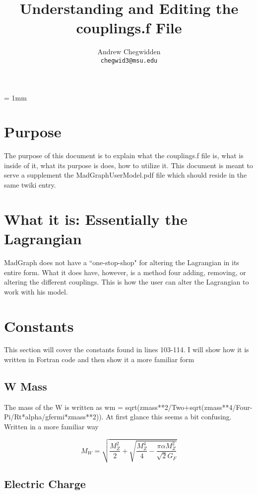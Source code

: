 \documentclass{article}
\author{Andrew Chegwidden\\
\texttt{chegwid3@msu.edu}
}
\title{Understanding and Editing the couplings.f File}
\begin{document}
\unitlength = 1mm

\maketitle

\section{Purpose}

The purpose of this document is to explain what the couplings.f file is, what is inside of it, what its purpose is does, how to utilize it.  This document is meant to serve a supplement the MadGraphUserModel.pdf file which should reside in the same twiki entry.

\section{What it is: Essentially the Lagrangian}

MadGraph does not have a ``one-stop-shop" for altering the Lagrangian in its entire form.  What it does have, however, is a method four adding, removing, or altering the different couplings.  This is how the user can alter the Lagrangian to work with his model.  

\section{Constants}

This section will cover the constants found in lines 103-114.  I will show how it is written in Fortran code and then show it a more familiar form

\subsection{W Mass}

The mass of the W is written as wm = sqrt(zmass**2/Two+sqrt(zmass**4/Four-Pi/Rt*alpha/gfermi*zmass**2)).  At first glance this seems a bit confusing.  Written in a more familiar way

\begin{equation}
M_W=\sqrt{\frac{M_Z^2}{2}+\sqrt{\frac{M_Z^4}{4}-\frac{\pi\alpha M_Z^2}{\sqrt{2}G_F}}}
\end{equation}

\subsection{Electric Charge}
\end{document}
